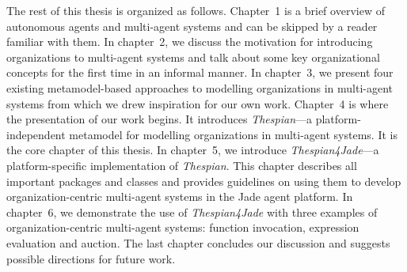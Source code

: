 The rest of this thesis is organized as follows.
Chapter~1 is a brief overview of autonomous agents and multi-agent systems and can be skipped by a reader familiar with them.
In chapter~2, we discuss the motivation for introducing organizations to multi-agent systems and talk about some key organizational concepts for the first time in an informal manner.
In chapter~3, we present four existing metamodel-based approaches to modelling organizations in multi-agent systems from which we drew inspiration for our own work.
Chapter~4 is where the presentation of our work begins. It introduces \textit{Thespian}---a platform-independent metamodel for modelling organizations in multi-agent systems. It is the core chapter of this thesis.
In chapter~5, we introduce \textit{Thespian4Jade}---a platform-specific implementation of \textit{Thespian}. This chapter describes all important packages and classes and provides guidelines on using them to develop organization-centric multi-agent systems in the Jade agent platform.
In chapter~6, we demonstrate the use of \textit{Thespian4Jade} with three examples of organization-centric multi-agent systems: function invocation, expression evaluation and auction.
The last chapter concludes our discussion and suggests possible directions for future work.